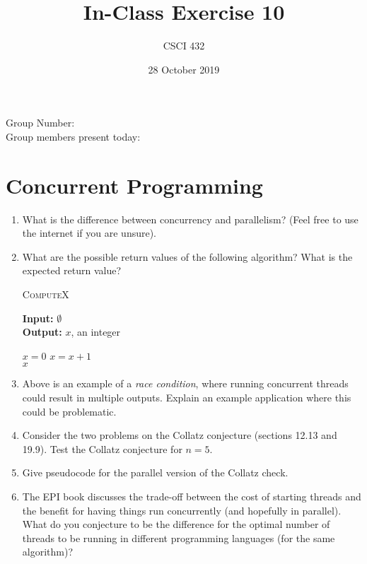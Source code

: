 \documentclass{article}
\title{In-Class Exercise 10}
\author{CSCI 432}
\date{28 October 2019}
\begin{document}
\maketitle

\noindent
Group Number:\\
Group members present today:

\section*{Concurrent Programming}

\begin{enumerate}
\item What is the difference between concurrency and parallelism? (Feel
free to use the internet if you are unsure).
\vspace{1in}


\item What are the possible return values of the following algorithm?  What
is the expected return value?
\begin{algorithm}\caption{\textsc{ComputeX}}
{\bf Input:} $\emptyset$\\
{\bf Output:} $x$, an integer
\begin{algorithmic}[1]
\State $x=0$
\State $x=x+1$
\EndFor\\
\Return $x$
\end{algorithmic}
\end{algorithm}
\vspace{1in}

\item Above is an  example of a \emph{race condition},
where running concurrent
threads could result in multiple outputs.  Explain an example
application where this could be problematic.
\vspace{3in}

\pagebreak
\item Consider the two problems on the Collatz conjecture (sections 12.13
and 19.9).  Test the Collatz conjecture for $n=5$.
\vspace{1in}

\item Give pseudocode for the parallel version of the Collatz check.
\vspace{3in}

\item The EPI book discusses the trade-off between the cost of starting
threads and the benefit for having things run concurrently (and
hopefully in parallel).  What do you conjecture to be the difference for
the optimal number of threads to be running in different programming
languages (for the same algorithm)?
\end{enumerate}
\end{document}
